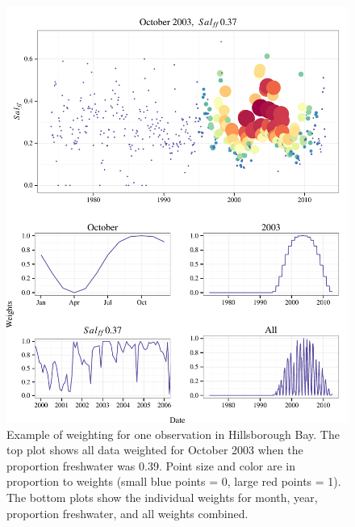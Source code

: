 \documentclass{svjour3}\usepackage[]{graphicx}\usepackage[]{color}
\begin{document}
\begin{figure}[!ht]


{\centering \includegraphics[width=6in]{figswtex} 

}

\caption[Example of weighting for one observation in Hillsborough Bay]{Example of weighting for one observation in Hillsborough Bay.  The top plot shows all data weighted for October 2003 when the proportion freshwater was 0.39.  Point size and color are in proportion to weights (small blue points = 0, large red points = 1).  The bottom plots show the individual weights for month, year, proportion freshwater, and all weights combined.\label{fig:wtex}}
\end{figure}
\end{document}
